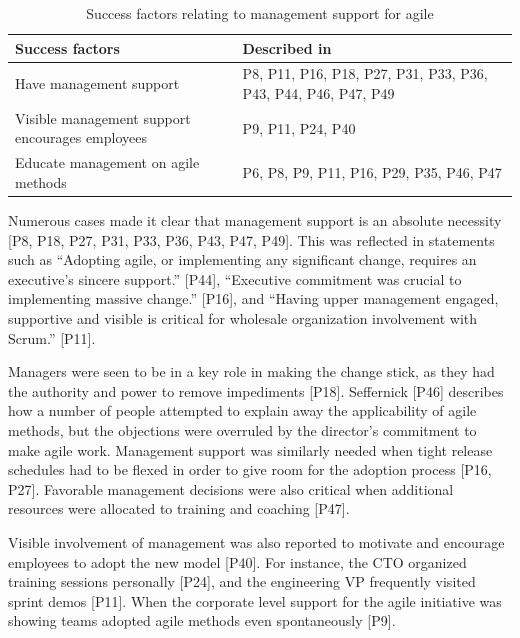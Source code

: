 \documentclass[preprint,authoryear,12pt]{elsarticle}
\begin{document}
\begin{table}[h]
    \centering
    \begin{tabular}{ >{\raggedright\arraybackslash}p{}
                     >{\raggedright\arraybackslash}p{} }
        \toprule
        Success factors  &  Described in \\
        \midrule
        Have management support  &
                P8, P11, P16, P18, P27, P31, P33, P36,
                P43, P44, P46, P47, P49  \\
        Visible management support encourages employees  &
                P9, P11, P24, P40  \\
        Educate management on agile methods  &
                P6, P8, P9, P11, P16, P29, P35, P46, P47  \\
        \bottomrule
    \end{tabular}
    \caption{Success factors relating to management support for agile}
    \label{table:success_management}
\end{table}


Numerous cases made it clear that management support is an absolute necessity
[P8, P18, P27, P31, P33, P36, P43, P47, P49].
This was reflected in statements such as ``Adopting agile, or implementing any
significant change, requires an executive’s sincere support.'' [P44],
``Executive commitment was crucial to implementing massive change.'' [P16], and
``Having upper management engaged, supportive and visible is critical for
wholesale organization involvement with Scrum.'' [P11].

Managers were seen to be in a key role in making the change stick, as they had
the authority and power to remove impediments [P18]. Seffernick [P46] describes
how a number of people attempted to explain away the applicability of agile
methods, but the objections were overruled by the director's commitment to make
agile work. Management support was similarly needed when tight release schedules
had to be flexed in order to give room for the adoption process [P16, P27].
Favorable management decisions were also critical when additional resources were
allocated to training and coaching [P47].

Visible involvement of management was also reported to motivate and encourage
employees to adopt the new model [P40]. For instance, the CTO organized training
sessions personally [P24], and the engineering VP frequently visited sprint
demos [P11]. When the corporate level support for the agile initiative was
showing teams adopted agile methods even spontaneously [P9].
\end{document}
